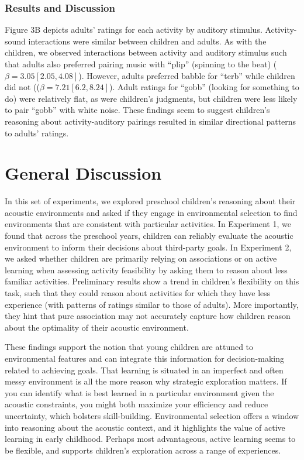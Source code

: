 \documentclass[10pt, letterpaper]{article}
\begin{document}
\hypertarget{results-and-discussion-2}{%
\subsubsection{Results and Discussion}\label{results-and-discussion-2}}

Figure 3B depicts adults' ratings for each activity by auditory
stimulus. Activity-sound interactions were similar between children and
adults. As with the children, we observed interactions between activity
and auditory stimulus such that adults also preferred pairing music with
``plip'' (spinning to the beat) (\(\beta = 3.05 [2.05, 4.08]\)).
However, adults preferred babble for ``terb'' while children did not
((\(\beta = 7.21 [6.2, 8.24]\)). Adult ratings for ``gobb'' (looking for
something to do) were relatively flat, as were children's judgments, but
children were less likely to pair ``gobb'' with white noise. These
findings seem to suggest children's reasoning about activity-auditory
pairings resulted in similar directional patterns to adults' ratings.

\hypertarget{general-discussion}{%
\section{General Discussion}\label{general-discussion}}

In this set of experiments, we explored preschool children's reasoning
about their acoustic environments and asked if they engage in
environmental selection to find environments that are consistent with
particular activities. In Experiment 1, we found that across the
preschool years, children can reliably evaluate the acoustic environment
to inform their decisions about third-party goals. In Experiment 2, we
asked whether children are primarily relying on associations or on
active learning when assessing activity feasibility by asking them to
reason about less familiar activities. Preliminary results show a trend
in children's flexibility on this task, such that they could reason
about activities for which they have less experience (with patterns of
ratings similar to those of adults). More importantly, they hint that
pure association may not accurately capture how children reason about
the optimality of their acoustic environment.

These findings support the notion that young children are attuned to
environmental features and can integrate this information for
decision-making related to achieving goals. That learning is situated in
an imperfect and often messy environment is all the more reason why
strategic exploration matters. If you can identify what is best learned
in a particular environment given the acoustic constraints, you might
both maximize your efficiency and reduce uncertainty, which bolsters
skill-building. Environmental selection offers a window into reasoning
about the acoustic context, and it highlights the value of active
learning in early childhood. Perhaps most advantageous, active learning
seems to be flexible, and supports children's exploration across a range
of experiences.
\end{document}
